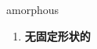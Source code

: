 
\begin{frame}
{\huge amorphous}
\begin{center}
\begin{enumerate}\Large
  \item \textbf{无固定形状的}
\end{enumerate}
\end{center}
\end{frame}
